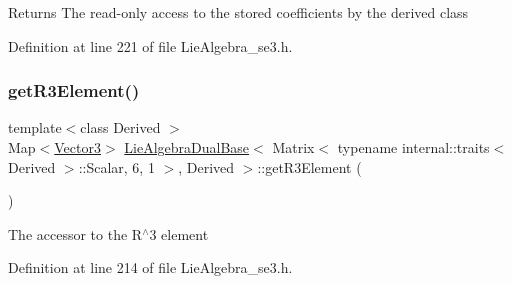 \begin{DoxyReturn}{Returns}
The read-\/only access to the stored coefficients by the derived class 
\end{DoxyReturn}


Definition at line 221 of file Lie\+Algebra\+\_\+se3.\+h.

\hypertarget{class_lie_algebra_dual_base_3_01_matrix_3_01typename_01internal_1_1traits_3_01_derived_01_4_1_1_7557dc73cbfcbc32e399b9855a977d47_abc22911715c749b5b21f5c65170ec3ea}{}\label{class_lie_algebra_dual_base_3_01_matrix_3_01typename_01internal_1_1traits_3_01_derived_01_4_1_1_7557dc73cbfcbc32e399b9855a977d47_abc22911715c749b5b21f5c65170ec3ea} 
\subsubsection{\texorpdfstring{get\+R3\+Element()}{getR3Element()}\hspace{0.1cm}{\footnotesize\ttfamily [1/2]}}
{\footnotesize\ttfamily template$<$class Derived $>$ \\
Map$<$\hyperlink{class_lie_algebra_dual_base_3_01_matrix_3_01typename_01internal_1_1traits_3_01_derived_01_4_1_1_7557dc73cbfcbc32e399b9855a977d47_acd7fd5207d2c438f3f26f99eeedf280d}{Vector3}$>$ \hyperlink{class_lie_algebra_dual_base}{Lie\+Algebra\+Dual\+Base}$<$ Matrix$<$ typename internal\+::traits$<$ Derived $>$\+::Scalar, 6, 1 $>$, Derived $>$\+::get\+R3\+Element (\begin{DoxyParamCaption}{ }\end{DoxyParamCaption})\hspace{0.3cm}{\ttfamily [inline]}}

The accessor to the R$^\wedge$3 element 

Definition at line 214 of file Lie\+Algebra\+\_\+se3.\+h.

\hypertarget{class_lie_algebra_dual_base_3_01_matrix_3_01typename_01internal_1_1traits_3_01_derived_01_4_1_1_7557dc73cbfcbc32e399b9855a977d47_a796dd32c716dc56d80484b799f7031b5}{}\label{class_lie_algebra_dual_base_3_01_matrix_3_01typename_01internal_1_1traits_3_01_derived_01_4_1_1_7557dc73cbfcbc32e399b9855a977d47_a796dd32c716dc56d80484b799f7031b5} 
